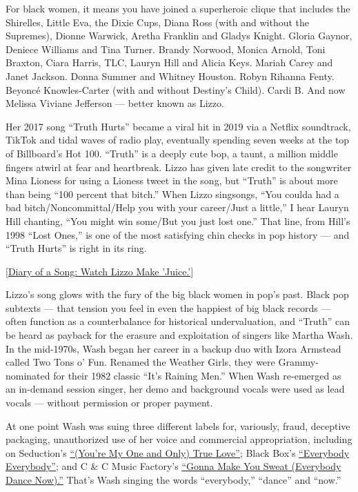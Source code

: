 For black women, it means you have joined a superheroic clique that
includes the Shirelles, Little Eva, the Dixie Cups, Diana Ross (with and
without the Supremes), Dionne Warwick, Aretha Franklin and Gladys
Knight. Gloria Gaynor, Deniece Williams and Tina Turner. Brandy Norwood,
Monica Arnold, Toni Braxton, Ciara Harris, TLC, Lauryn Hill and Alicia
Keys. Mariah Carey and Janet Jackson. Donna Summer and Whitney Houston.
Robyn Rihanna Fenty. Beyoncé Knowles-Carter (with and without Destiny's
Child). Cardi B. And now Melissa Viviane Jefferson --- better known as
Lizzo.

Her 2017 song ``Truth Hurts'' became a viral hit in 2019 via a Netflix
soundtrack, TikTok and tidal waves of radio play, eventually spending
seven weeks at the top of Billboard's Hot 100. ``Truth'' is a deeply
cute bop, a taunt, a million middle fingers atwirl at fear and
heartbreak. Lizzo has given late credit to the songwriter Mina Lioness
for using a Lioness tweet in the song, but ``Truth'' is about more than
being ``100 percent that bitch.'' When Lizzo singsongs, ``You coulda had
a bad bitch/Noncommittal/Help you with your career/Just a little,'' I
hear Lauryn Hill chanting, ``You might win some/But you just lost one.''
That line, from Hill's 1998 ``Lost Ones,'' is one of the most satisfying
chin checks in pop history --- and ``Truth Hurts'' is right in its ring.

\href{https://www.nytimes3xbfgragh.onion/video/arts/music/100000006417770/lizzo-juice.html}{{[}Diary
of a Song: Watch Lizzo Make 'Juice.'{]}}

Lizzo's song glows with the fury of the big black women in pop's past.
Black pop subtexts --- that tension you feel in even the happiest of big
black records --- often function as a counterbalance for historical
undervaluation, and ``Truth'' can be heard as payback for the erasure
and exploitation of singers like Martha Wash. In the mid-1970s, Wash
began her career in a backup duo with Izora Armstead called Two Tons o'
Fun. Renamed the Weather Girls, they were Grammy-nominated for their
1982 classic ``It's Raining Men.'' When Wash re-emerged as an in-demand
session singer, her demo and background vocals were used as lead vocals
--- without permission or proper payment.

At one point Wash was suing three different labels for, variously,
fraud, deceptive packaging, unauthorized use of her voice and commercial
appropriation, including on Seduction's
\href{https://www.youtube.com/watch?v=0IBJlUWDy9c}{``(You're My One and
Only) True Love''}; Black Box's
\href{https://www.youtube.com/watch?v=18N2k1TBBRE}{``Everybody
Everybody''}; and C \& C Music Factory's
\href{https://www.youtube.com/watch?v=LaTGrV58wec}{``Gonna Make You
Sweat (Everybody Dance Now).''} That's Wash singing the words
``everybody,'' ``dance'' and ``now.''

